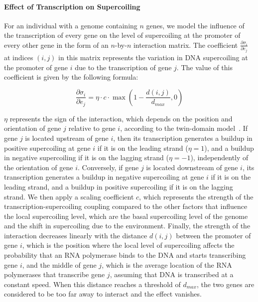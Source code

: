 \paragraph{Effect of Transcription on Supercoiling}
For an individual with a genome containing $n$ genes, we model the influence of the transcription of every gene on the level of supercoiling at the promoter of every other gene in the form of an $n$-by-$n$ interaction matrix.
The coefficient $\frac{\partial\sigma_i}{\partial e_j}$ at indices $(i, j)$ in this matrix represents the variation in DNA supercoiling at the promoter of gene $i$ due to the transcription of gene $j$.
The value of this coefficient is given by the following formula:

\begin{equation}
  \frac{\partial\sigma_{i}}{\partial e_j} = \eta \cdot c \cdot \max(1-\frac{d(i, j)}{d_{max}}, 0)
  \label{eq:dsigmade}
\end{equation}

$\eta$ represents the sign of the interaction, which depends on the position and orientation of gene $j$ relative to gene $i$, according to the twin-domain model~\citep{liu1987}.
If gene $j$ is located upstream of gene $i$, then its transcription generates a buildup in positive supercoiling at gene $i$ if it is on the leading strand ($\eta = 1$), and a buildup in negative supercoiling if it is on the lagging strand ($\eta = -1$), independently of the orientation of gene $i$.
Conversely, if gene $j$ is located downstream of gene $i$, its transcription generates a buildup in negative supercoiling at gene $i$ if it is on the leading strand, and a buildup in positive supercoiling if it is on the lagging strand.
We then apply a scaling coefficient $c$, which represents the strength of the transcription-supercoiling coupling compared to the other factors that influence the local supercoiling level, which are the basal supercoiling level of the genome and the shift in supercoiling due to the environment.
Finally, the strength of the interaction decreases linearly with the distance $d(i, j)$ between the promoter of gene $i$, which is the position where the local level of supercoiling affects the probability that an RNA polymerase binds to the DNA and starts transcribing gene $i$, and the middle of gene $j$, which is the average location of the RNA polymerases that transcribe gene $j$, assuming that DNA is transcribed at a constant speed.
When this distance reaches a threshold of $d_{max}$, the two genes are considered to be too far away to interact and the effect vanishes.

